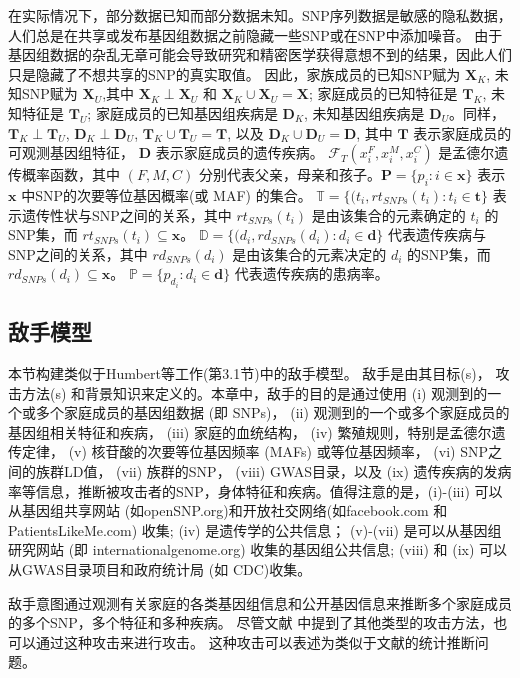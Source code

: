 在实际情况下，部分数据已知而部分数据未知。SNP序列数据是敏感的隐私数据，人们总是在共享或发布基因组数据之前隐藏一些SNP或在SNP中添加噪音。 由于基因组数据的杂乱无章可能会导致研究和精密医学获得意想不到的结果，因此人们只是隐藏了不想共享的SNP的真实取值。 因此，家族成员的已知SNP赋为 $\mathbf{X}_K$, 未知SNP赋为 $\mathbf{X}_U$,其中 $\mathbf{X}_K \perp\mathbf{X}_U$ 和 $\mathbf{X}_K \cup \mathbf{X}_U = \mathbf{X}$; 家庭成员的已知特征是 $\mathbf{T}_K$, 未知特征是 $\mathbf{T}_U$; 家庭成员的已知基因组疾病是 $\mathbf{D}_K$, 未知基因组疾病是 $\mathbf{D}_U$。同样， $\mathbf{T}_K \perp \mathbf{T}_U$, $\mathbf{D}_K \perp \mathbf{D}_U$, $\mathbf{T}_K \cup \mathbf{T}_U = \mathbf{T}$, 以及 $\mathbf{D}_K \cup \mathbf{D}_U = \mathbf{D}$, 其中 $\mathbf{T}$ 表示家庭成员的可观测基因组特征， $\mathbf{D}$ 表示家庭成员的遗传疾病。 $\mathcal{F}_T(x_i^F,x_i^M,x_i^C)$ 是孟德尔遗传概率函数，其中 $(F,M,C)$ 分别代表父亲，母亲和孩子。$\mathbf{P}=\{p_i: i \in \mathbf{x}\}$ 表示 $\mathbf{x}$ 中SNP的次要等位基因概率(或 MAF) 的集合。 $\mathbb{T}=\{(t_i,rt_{SNPs}(t_i): t_i \in \mathbf{t}\}$ 表示遗传性状与SNP之间的关系，其中 $rt_{SNPs}(t_i)$ 是由该集合的元素确定的 $t_i$ 的SNP集，而 $rt_{SNPs}(t_i) \subseteq \mathbf{x}$。 $\mathbb{D}=\{(d_i,rd_{SNPs}(d_i): d_i \in \mathbf{d}\}$ 代表遗传疾病与SNP之间的关系，其中 $rd_{SNPs}(d_i)$ 是由该集合的元素决定的 $d_i$ 的SNP集，而 $rd_{SNPs}(d_i) \subseteq \mathbf{x}$。 $\mathbb{P}=\{p_{d_i}: d_i \in \mathbf{d}\}$ 代表遗传疾病的患病率。

\subsection{敌手模型}

本节构建类似于Humbert等工作\cite{humbert2013addressing}(第3.1节)中的敌手模型。 敌手是由其目标(s)， 攻击方法(s) 和背景知识来定义的。本章中，敌手的目的是通过使用 (i) 观测到的一个或多个家庭成员的基因组数据 (即 SNPs)，  (ii) 观测到的一个或多个家庭成员的基因组相关特征和疾病， (iii) 家庭的血统结构， (iv) 繁殖规则，特别是孟德尔遗传定律， (v) 核苷酸的次要等位基因频率 (MAFs) 或等位基因频率， (vi) SNP之间的族群LD值， (vii) 族群的SNP， (viii) GWAS目录，以及 (ix) 遗传疾病的发病率等信息，推断被攻击者的SNP，身体特征和疾病。值得注意的是，(i)-(iii) 可以从基因组共享网站 (如openSNP.org)和开放社交网络(如facebook.com 和 PatientsLikeMe.com) 收集; (iv) 是遗传学的公共信息； (v)-(vii) 是可以从基因组研究网站 (即 internationalgenome.org) 收集的基因组公共信息; (viii) 和 (ix) 可以从GWAS目录项目和政府统计局 (如 CDC)收集。

敌手意图通过观测有关家庭的各类基因组信息和公开基因信息来推断多个家庭成员的多个SNP，多个特征和多种疾病。 尽管文献\cite{humbert2013addressing} 中提到了其他类型的攻击方法，也可以通过这种攻击来进行攻击。 这种攻击可以表述为类似于文献\cite{humbert2013addressing,humbert2017quantifying,deznabi2018inference}的统计推断问题。

